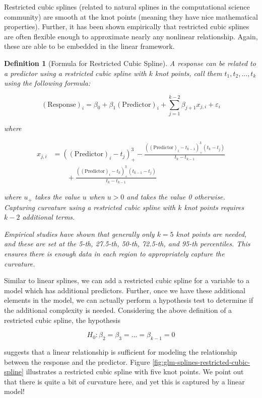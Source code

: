 \documentclass[
]{book}
\theoremstyle{plain}
\theoremstyle{mydefn}
\newtheorem{definition}{Definition}[chapter]
\theoremstyle{myexmpl}
\theoremstyle{remark}
\begin{document}
Restricted cubic splines (related to natural splines in the computational science community) are smooth at the knot points (meaning they have nice mathematical properties). Further, it has been shown empirically that restricted cubic splines are often flexible enough to approximate nearly any nonlinear relationship. Again, these are able to be embedded in the linear framework.

\begin{definition}[Formula for Restricted Cubic Spline]
A response can be related to a predictor using a restricted cubic spline with \(k\) knot points, call them \(t_1, t_2, \dotsc, t_k\) using the following formula:

\[(\text{Response})_i = \beta_0 + \beta_1 (\text{Predictor})_i + \sum_{j=1}^{k-2} \beta_{j+1} x_{j,i} + \varepsilon_i\]

where

\[
\begin{aligned}
  x_{j,i} &= \left((\text{Predictor})_i - t_j\right)^3_{+} - \frac{\left((\text{Predictor})_i - t_{k-1}\right)^3_{+} \left(t_k - t_j\right)}{t_k - t_{k-1}} \\
    &\qquad +\frac{\left((\text{Predictor})_i - t_k\right)^3_{+} \left(t_{k-1} - t_j\right)}{t_k - t_{k-1}}
\end{aligned}
\]

where \(u_{+}\) takes the value \(u\) when \(u > 0\) and takes the value 0 otherwise. Capturing curvature using a restricted cubic spline with \(k\) knot points requires \(k-2\) additional terms.

Empirical studies have shown that generally only \(k = 5\) knot points are needed, and these are set at the 5-th, 27.5-th, 50-th, 72.5-th, and 95-th percentiles. This ensures there is enough data in each region to appropriately capture the curvature.
\end{definition}

Similar to linear splines, we can add a restricted cubic spline for a variable to a model which has additional predictors. Further, once we have these additional elements in the model, we can actually perform a hypothesis test to determine if the additional complexity is needed. Considering the above definition of a restricted cubic spline, the hypothesis

\[H_0: \beta_2 = \beta_3 = \dotsc = \beta_{k-1} = 0\]

suggests that a linear relationship is sufficient for modeling the relationship between the response and the predictor. Figure \ref{fig:glm-splines-restricted-cubic-spline} illustrates a restricted cubic spline with five knot points. We point out that there is quite a bit of curvature here, and yet this is captured by a linear model!
\end{document}
